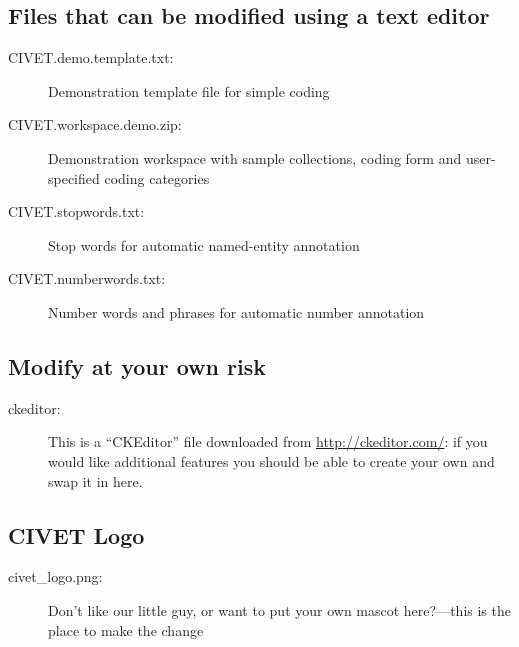 \documentclass[letterpaper,10pt,english]{sphinxmanual}
\begin{document}
\subsection{Files that can be modified using a text editor}
\label{appendix3:files-that-can-be-modified-using-a-text-editor}\begin{description}
\item[{CIVET.demo.template.txt:}] \leavevmode
Demonstration template file for simple coding

\item[{CIVET.workspace.demo.zip:}] \leavevmode
Demonstration workspace with sample collections, coding form and
user-specified coding categories

\item[{CIVET.stopwords.txt:}] \leavevmode
Stop words for automatic named-entity annotation

\item[{CIVET.numberwords.txt:}] \leavevmode
Number words and phrases for automatic number annotation

\end{description}


\subsection{Modify at your own risk}
\label{appendix3:modify-at-your-own-risk}\begin{description}
\item[{ckeditor:}] \leavevmode
This is a “CKEditor” file downloaded from
\href{http://ckeditor.com/}{http://ckeditor.com/}: if you would like additional features you
should be able to create your own and swap it in here.

\end{description}


\subsection{CIVET Logo}
\label{appendix3:civet-logo}\begin{description}
\item[{civet\_logo.png:}] \leavevmode
Don’t like our little guy, or want to put your own mascot here?—this
is the place to make the change

\end{description}
\end{document}
